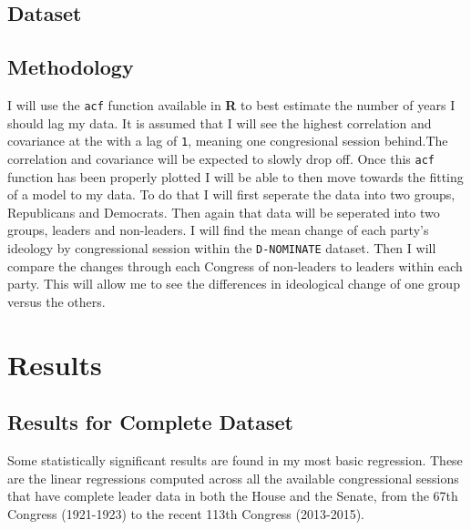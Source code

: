 \documentclass[12pt,twoside]{reedthesis}
\begin{document}
  \section{Dataset}\label{dataset}
  
  \section{Methodology}\label{methodology}
  
  I will use the \texttt{acf} function available in \textbf{R} to best
  estimate the number of years I should lag my data. It is assumed that I
  will see the highest correlation and covariance at the with a lag of
  \texttt{1}, meaning one congresional session behind.The correlation and
  covariance will be expected to slowly drop off. Once this \texttt{acf}
  function has been properly plotted I will be able to then move towards
  the fitting of a model to my data. To do that I will first seperate the
  data into two groups, Republicans and Democrats. Then again that data
  will be seperated into two groups, leaders and non-leaders. I will find
  the mean change of each party's ideology by congressional session within
  the \texttt{D-NOMINATE} dataset. Then I will compare the changes through
  each Congress of non-leaders to leaders within each party. This will
  allow me to see the differences in ideological change of one group
  versus the others.
  
  \chapter{Results}\label{results}
  
  \section{Results for Complete
  Dataset}\label{results-for-complete-dataset}
  
  Some statistically significant results are found in my most basic
  regression. These are the linear regressions computed across all the
  available congressional sessions that have complete leader data in both
  the House and the Senate, from the 67th Congress (1921-1923) to the
  recent 113th Congress (2013-2015).
  
\end{document}
